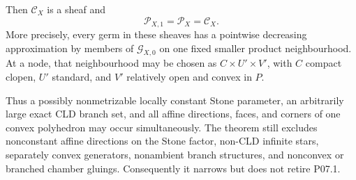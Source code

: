 \begin{theorem}
Then $\mathcal C_X$ is a sheaf and
\begin{equation}
                 \mathcal P_{X,1}=\mathcal P_X=\mathcal C_X.
 \label{eq:p071-stone-infinite-polyhedral-collapse}
\end{equation}
More precisely, every germ in these sheaves has a pointwise decreasing
approximation by members of $\mathcal G_{X,0}$ on one fixed smaller
product neighbourhood.  At a node, that neighbourhood may be chosen as
$C\times U'\times V'$, with $C$ compact clopen, $U'$ standard, and
$V'$ relatively open and convex in $P$.

Thus a possibly nonmetrizable locally constant Stone parameter, an
arbitrarily large exact CLD branch set, and all affine directions, faces,
and corners of one convex polyhedron may occur simultaneously.  The
theorem still excludes nonconstant affine directions on the Stone factor,
non-CLD infinite stars, separately convex generators, nonambient branch
structures, and nonconvex or branched chamber gluings.  Consequently it
narrows but does not retire P07.1.
\end{theorem}
